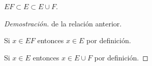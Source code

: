 \item $EF \subset E \subset E \cup F$.

\begin{proof}[Demostración] de la relación anterior.

    Si $x \in EF$ entonces $x \in E$ por definici\'on.

    Si $x \in E$ entonces $x \in E\cup F$ por definici\'on. \qedhere
\end{proof}